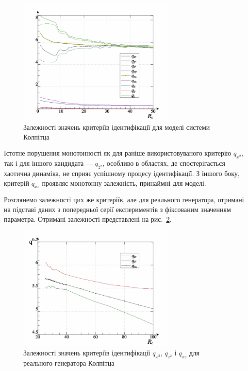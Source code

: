 \begin{figure}[htb!]
\centerline{\includegraphics[width=0.7\textwidth]{p/colp_bjt_q-p_Rc_q.png} }
\caption{Залежності значень критеріїв ідентифікації для моделі системи Колпітца}
\label{atu:f:colp_bjt_q-p_Rc_q}
\end{figure}

Істотне порушення монотонності як для раніше використовуваного
критерію
$ q_{x^2} $, так і для іншого кандидата ---
$ q_{z^2} $, особливо в областях, де спостерігається хаотична
динаміка, не сприяє успішному процесу ідентифікації. З іншого
боку, критерій
$ q_{xz} $ проявляє монотонну залежність, принаймні для моделі.

Розглянемо залежності цих же критеріїв, але для реального
генератора, отримані на підставі даних з попередньої серії
експериментів з фіксованим значенням параметра. Отримані
залежності представлені на рис.~\ref{atu:f:colp_read_q-p_Rc_q-p_Rc_q}.


\begin{figure}[htb!]
\centerline{\includegraphics[width=0.7\textwidth]{p/colp_read_q-p_Rc_q.png} }
\caption{Залежності значень критеріїв ідентифікації $ q_{x^2} $, $ q_{z^2} $ і $ q_{xz} $ для реального генератора Колпітца}
\label{atu:f:colp_read_q-p_Rc_q-p_Rc_q}
\end{figure}

